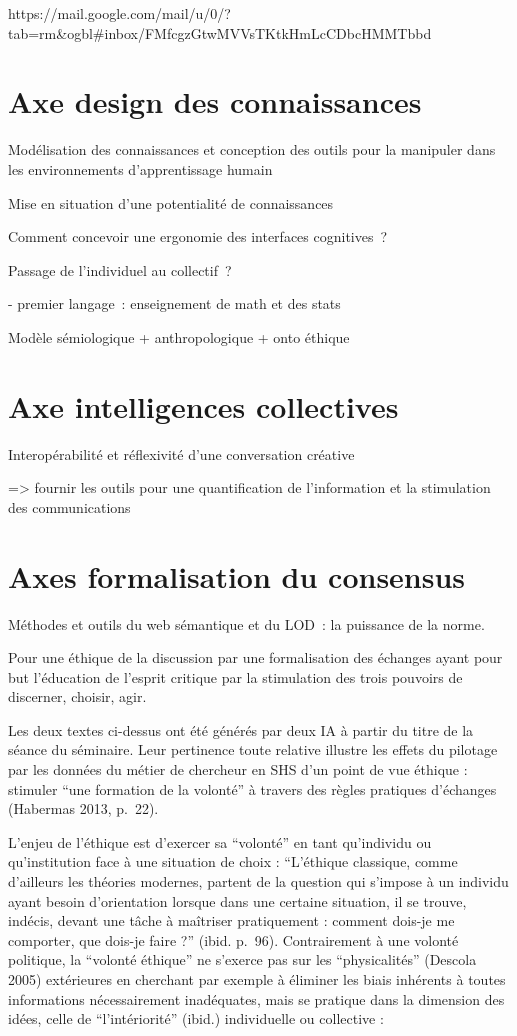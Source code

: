 \documentclass[
  a4paper,
  DIV=11,
  numbers=noendperiod]{scrreprt}
\begin{document}
https://mail.google.com/mail/u/0/?tab=rm\&ogbl\#inbox/FMfcgzGtwMVVsTKtkHmLcCDbcHMMTbbd

\section{Axe design des connaissances}\label{sec-axeDesignConnaissances}

Modélisation des connaissances et conception des outils pour la
manipuler dans les environnements d'apprentissage humain

Mise en situation d'une potentialité de connaissances

Comment concevoir une ergonomie des interfaces cognitives~?

Passage de l'individuel au collectif~?

- premier langage~: enseignement de math et des stats

Modèle sémiologique + anthropologique + onto éthique

\section{Axe intelligences collectives}\label{sec-axeIntelCo}

Interopérabilité et réflexivité d'une conversation créative

=\textgreater{} fournir les outils pour une quantification de
l'information et la stimulation des communications

\section{Axes formalisation du consensus}\label{sec-axeFormaConsensus}

Méthodes et outils du web sémantique et du LOD~: la puissance de la
norme.

Pour une éthique de la discussion par une formalisation des échanges
ayant pour but l'éducation de l'esprit critique par la stimulation des
trois pouvoirs de discerner, choisir, agir.

Les deux textes ci-dessus ont été générés par deux IA à partir du titre
de la séance du séminaire. Leur pertinence toute relative illustre les
effets du pilotage par les données du métier de chercheur en SHS d'un
point de vue éthique : stimuler ``une formation de la volonté'' à
travers des règles pratiques d'échanges (Habermas 2013, p.~22).

L'enjeu de l'éthique est d'exercer sa ``volonté'' en tant qu'individu ou
qu'institution face à une situation de choix : ``L'éthique classique,
comme d'ailleurs les théories modernes, partent de la question qui
s'impose à un individu ayant besoin d'orientation lorsque dans une
certaine situation, il se trouve, indécis, devant une tâche à maîtriser
pratiquement : comment dois-je me comporter, que dois-je faire ?''
(ibid. p.~96). Contrairement à une volonté politique, la ``volonté
éthique'' ne s'exerce pas sur les ``physicalités'' (Descola 2005)
extérieures en cherchant par exemple à éliminer les biais inhérents à
toutes informations nécessairement inadéquates, mais se pratique dans la
dimension des idées, celle de ``l'intériorité'' (ibid.) individuelle ou
collective :
\end{document}
